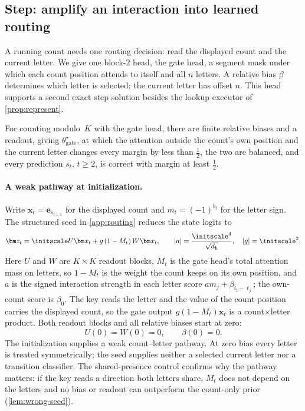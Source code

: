 \subsection{Step: amplify an interaction into learned routing}
A running count needs one routing decision: read the displayed count and the current letter.
We give one block-$2$ head, the gate head, a segment mask under which each count position attends to itself and all $n$ letters.
A relative bias $\beta$ determines which letter is selected; the current letter has offset $n$.
This head supports a second exact step solution besides the lookup executor of \cref{prop:represent}.

\begin{proposition}
\label{prop:gate}
For counting modulo~$K$ with the gate head, there are finite relative biases and a readout, giving $\theta^\star_{\mathrm{gate}}$, at
which the attention outside the count's own position and the current letter changes every margin by less than $\tfrac12$, the
two are balanced, and every prediction $s_t$, $t\ge2$, is correct with margin at least $\tfrac12$.
\end{proposition}

\paragraph{A weak pathway at initialization.}
Write $\bm x_t=\bm e_{s_{t-1}}$ for the displayed count and $m_t=(-1)^{b_t}$ for the letter sign.
The structured seed in \cref{app:routing} reduces the state logits to
\[
 \bm z_t=\initscale U\bm x_t+g\,(1-M_t)\,W\bm x_t,
 \qquad |a|=\frac{\initscale^4}{\sqrt{d_{\mathrm h}}},\quad |g|=\initscale^2.
\]
Here $U$ and $W$ are $K\times K$ readout blocks, $M_t$ is the gate head's total attention mass on letters, so $1-M_t$ is the weight
the count keeps on its own position, and $a$ is the signed interaction strength in each letter score $am_j+\beta_{i_t-\ell_j}$; the
own-count score is $\beta_0$. The key reads the letter and the value of the count position carries the displayed count, so the gate
output $g(1-M_t)\bm x_t$ is a count$\times$letter product. Both readout blocks and all relative biases start at zero:
\[
 U(0)=W(0)=0,\qquad \beta(0)=0.
\]
The initialization supplies a weak count--letter pathway. At zero bias every letter is treated symmetrically;
the seed supplies neither a selected current letter nor a transition classifier.
The shared-presence control confirms why the pathway matters: if the key reads a direction both letters share,
$M_t$ does not depend on the letters and no bias or readout can outperform the count-only prior (\cref{lem:wrong-seed}).

